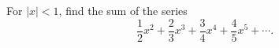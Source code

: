 For $|x|<1$, find the sum of the series
\[\dfrac12x^2+\dfrac23x^3+\dfrac34x^4+\dfrac45x^5+\cdots.\]
